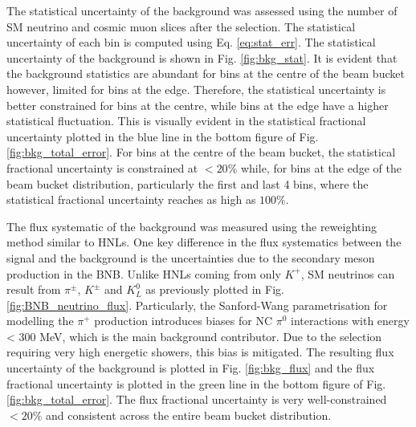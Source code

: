 The statistical uncertainty of the background was assessed using the number of SM neutrino and cosmic muon slices after the selection.                                                                                            
The statistical uncertainty of each bin is computed using Eq. \ref{eq:stat_err}.
The statistical uncertainty of the background is shown in Fig. \ref{fig:bkg_stat}.
It is evident that the background statistics are abundant for bins at the centre of the beam bucket however, limited for bins at the edge.
Therefore, the statistical uncertainty is better constrained for bins at the centre, while bins at the edge have 
a higher statistical fluctuation.
This is visually evident in the statistical fractional uncertainty plotted in the blue line in the bottom figure of Fig. \ref{fig:bkg_total_error}.                                                                               
For bins at the centre of the beam bucket, the statistical fractional uncertainty is constrained at $< 20\%$ while, for bins at the edge of the beam bucket distribution, particularly the first and last 4 bins, where the statistical fractional uncertainty reaches as high as $100\%$.

The flux systematic of the background was measured using the reweighting method similar to HNLs.              
One key difference in the flux systematics between the signal and the background is the uncertainties due to the secondary meson production in the BNB.                                                                           
Unlike HNLs coming from only $K^+$, SM neutrinos can result from $\pi^\pm$, $K^\pm$ and $K^0_L$ as previously plotted in Fig. \ref{fig:BNB_neutrino_flux}.
Particularly, the Sanford-Wang parametrisation for modelling the $\pi^+$ production introduces biases for NC $\pi^0$ interactions with energy < 300 MeV, which is the main background contributor.
Due to the selection requiring very high energetic showers, this bias is mitigated.
The resulting flux uncertainty of the background is plotted in Fig. \ref{fig:bkg_flux} and the flux fractional uncertainty is plotted in the green line in the bottom figure of Fig. \ref{fig:bkg_total_error}.
The flux fractional uncertainty is very well-constrained $<20 \%$ and consistent across the entire beam bucket distribution.

